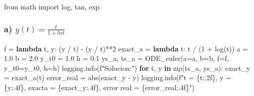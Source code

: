 \documentclass[
  letterpaper,
  DIV=11,
  numbers=noendperiod]{scrartcl}
\newenvironment{Shaded}{\begin{snugshade}}{\end{snugshade}}
\newcommand{\BuiltInTok}[1]{\textcolor[rgb]{0.00,0.23,0.31}{#1}}
\newcommand{\ControlFlowTok}[1]{\textcolor[rgb]{0.00,0.23,0.31}{\textbf{#1}}}
\newcommand{\DecValTok}[1]{\textcolor[rgb]{0.68,0.00,0.00}{#1}}
\newcommand{\FloatTok}[1]{\textcolor[rgb]{0.68,0.00,0.00}{#1}}
\newcommand{\ImportTok}[1]{\textcolor[rgb]{0.00,0.46,0.62}{#1}}
\newcommand{\KeywordTok}[1]{\textcolor[rgb]{0.00,0.23,0.31}{\textbf{#1}}}
\newcommand{\NormalTok}[1]{\textcolor[rgb]{0.00,0.23,0.31}{#1}}
\newcommand{\OperatorTok}[1]{\textcolor[rgb]{0.37,0.37,0.37}{#1}}
\newcommand{\SpecialCharTok}[1]{\textcolor[rgb]{0.37,0.37,0.37}{#1}}
\newcommand{\SpecialStringTok}[1]{\textcolor[rgb]{0.13,0.47,0.30}{#1}}
\begin{document}
\begin{Shaded}
\begin{Highlighting}[]
\ImportTok{from}\NormalTok{ math }\ImportTok{import}\NormalTok{ log, tan, exp}
\end{Highlighting}
\end{Shaded}

\subsubsection{\texorpdfstring{a)
\(y(t)=\frac{t}{1+lnt}\)}{a) y(t)=\textbackslash frac\{t\}\{1+lnt\}}}\label{a-ytfract1lnt}

\begin{Shaded}
\begin{Highlighting}[]
\NormalTok{f }\OperatorTok{=} \KeywordTok{lambda}\NormalTok{ t, y: (y }\OperatorTok{/}\NormalTok{ t) }\OperatorTok{{-}}\NormalTok{ (y }\OperatorTok{/}\NormalTok{ t)}\OperatorTok{**}\DecValTok{2}
\NormalTok{exact\_a }\OperatorTok{=} \KeywordTok{lambda}\NormalTok{ t: t }\OperatorTok{/}\NormalTok{ (}\DecValTok{1} \OperatorTok{+}\NormalTok{ log(t))}
\NormalTok{a }\OperatorTok{=} \FloatTok{1.0}
\NormalTok{b }\OperatorTok{=} \FloatTok{2.0}
\NormalTok{y\_t0 }\OperatorTok{=} \FloatTok{1.0}
\NormalTok{h }\OperatorTok{=} \FloatTok{0.1}
\NormalTok{ys\_a, ts\_a }\OperatorTok{=}\NormalTok{ ODE\_euler(a}\OperatorTok{=}\NormalTok{a, b}\OperatorTok{=}\NormalTok{b, f}\OperatorTok{=}\NormalTok{f, y\_t0}\OperatorTok{=}\NormalTok{y\_t0, h}\OperatorTok{=}\NormalTok{h)}
\NormalTok{logging.info(}\SpecialStringTok{f"Solucion:"}\NormalTok{)}
\ControlFlowTok{for}\NormalTok{ t, y }\KeywordTok{in} \BuiltInTok{zip}\NormalTok{(ts\_a, ys\_a):}
\NormalTok{    exact\_y }\OperatorTok{=}\NormalTok{ exact\_a(t)}
\NormalTok{    error\_real }\OperatorTok{=} \BuiltInTok{abs}\NormalTok{(exact\_y }\OperatorTok{{-}}\NormalTok{ y)}
\NormalTok{    logging.info(}\SpecialStringTok{f"t = }\SpecialCharTok{\{}\NormalTok{t}\SpecialCharTok{:.2f\}}\SpecialStringTok{, y = }\SpecialCharTok{\{}\NormalTok{y}\SpecialCharTok{:.4f\}}\SpecialStringTok{, exacta = }\SpecialCharTok{\{}\NormalTok{exact\_y}\SpecialCharTok{:.4f\}}\SpecialStringTok{, error real = }\SpecialCharTok{\{}\NormalTok{error\_real}\SpecialCharTok{:.4f\}}\SpecialStringTok{"}\NormalTok{)}
\end{Highlighting}
\end{Shaded}
\end{document}
